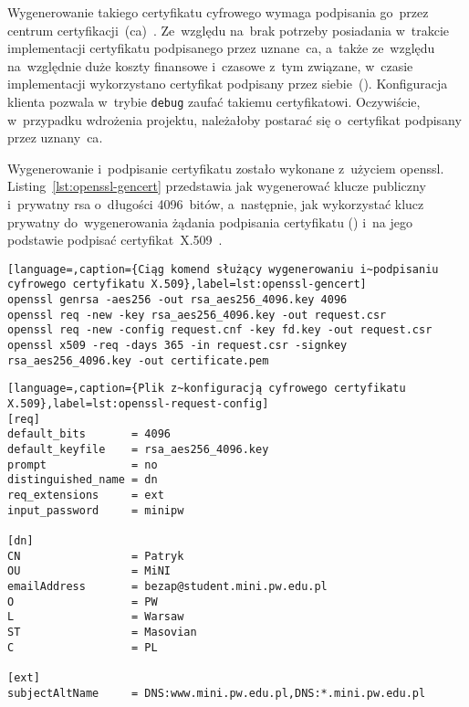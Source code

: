 \documentclass[thesis]{subfiles}
\begin{document}
Wygenerowanie takiego certyfikatu cyfrowego wymaga podpisania go~przez centrum certyfikacji~(\gls{ca})~\cite{wiki:ca}. Ze~względu na~brak potrzeby posiadania w~trakcie implementacji certyfikatu podpisanego przez uznane~\gls{ca}, a~także ze~względu na~względnie duże koszty finansowe i~czasowe z~tym związane, w~czasie implementacji wykorzystano certyfikat podpisany przez siebie~(). Konfiguracja klienta pozwala w~trybie \texttt{debug} zaufać takiemu certyfikatowi. Oczywiście, w~przypadku wdrożenia projektu, należałoby postarać się o~certyfikat podpisany przez uznany~\gls{ca}.

Wygenerowanie i~podpisanie certyfikatu zostało wykonane z~użyciem \gls{openssl}. Listing~\ref{lst:openssl-gencert} przedstawia jak wygenerować klucze publiczny i~prywatny \gls{rsa} o~długości 4096~bitów, a~następnie, jak wykorzystać klucz prywatny do~wygenerowania żądania podpisania certyfikatu () i~na jego podstawie podpisać certyfikat~X.509~\cite{openssl-cookbook,wiki:csr}.

\begin{minipage}{\linewidth} %
\begin{lstlisting}[language=,caption={Ciąg komend służący wygenerowaniu i~podpisaniu cyfrowego certyfikatu X.509},label=lst:openssl-gencert]
openssl genrsa -aes256 -out rsa_aes256_4096.key 4096
openssl req -new -key rsa_aes256_4096.key -out request.csr
openssl req -new -config request.cnf -key fd.key -out request.csr
openssl x509 -req -days 365 -in request.csr -signkey rsa_aes256_4096.key -out certificate.pem
\end{lstlisting}
\end{minipage}

\begin{lstlisting}[language=,caption={Plik z~konfiguracją cyfrowego certyfikatu X.509},label=lst:openssl-request-config]
[req]
default_bits       = 4096
default_keyfile    = rsa_aes256_4096.key
prompt             = no
distinguished_name = dn
req_extensions     = ext
input_password     = minipw

[dn]
CN                 = Patryk
OU                 = MiNI
emailAddress       = bezap@student.mini.pw.edu.pl
O                  = PW
L                  = Warsaw
ST                 = Masovian
C                  = PL

[ext]
subjectAltName     = DNS:www.mini.pw.edu.pl,DNS:*.mini.pw.edu.pl
\end{lstlisting}
\end{document}
